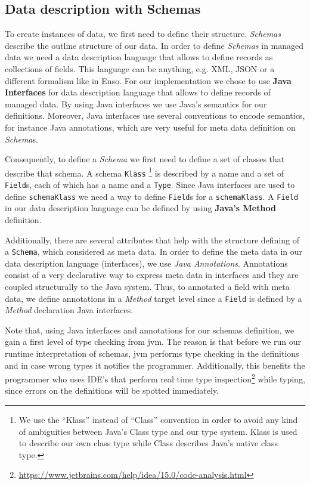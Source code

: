 \subsection{Data description with Schemas}\label{Schema Definition}
To create instances of data, we first need to define their structure.
\textit{Schemas} describe the outline structure of our data.
In order to define \textit{Schemas} in managed data we need a data description language that allows to define records as collections of fields. 
This language can be anything, e.g. XML, JSON or a different formalism like in Enso.
For our implementation we chose to use \textbf{Java Interfaces} for data description language that allows to define records of managed data.
By using Java interfaces we use Java's semantics for our definitions.
Moreover, Java interfaces use several conventions to encode semantics, for instance Java annotations, which are very useful for meta data definition on \textit{Schema}s.

Consequently, to define a \textit{Schema} we first need to define a set of classes that describe that schema.
A schema \texttt{Klass} \footnote{
	We use the ``Klass'' instead of ``Class'' convention in order to avoid any kind of ambiguities between Java's Class type and our type system. Klass is used to describe our own class type while Class describes Java's native class type.} 
is described by a name and a set of \texttt{Field}s, each of which has a name and a \texttt{Type}.
Since Java interfaces are used to define \texttt{schemaKlass} we need a way to define \texttt{Field}s for a \texttt{schemaKlass}.
A \texttt{Field} in our data description language can be defined by using \textbf{Java's Method} definition.

Additionally, there are several attributes that help with the structure defining of a \texttt{Schema}, which considered as meta data.
In order to define the meta data in our data description language (interfaces), we use \textit{Java Annotations}.
Annotations consist of a very declarative way to express meta data in interfaces and they are coupled structurally to the Java system.
Thus, to annotated a field with meta data, we define annotations in a \textit{Method} target level since a \texttt{Field} is defined by a \textit{Method} declaration Java interfaces.

Note that, using Java interfaces and annotations for our schemas definition, we gain a first level of type checking from \ac{jvm}. 
The reason is that before we run our runtime interpretation of schemas, \ac{jvm} performs type checking in the definitions and in case wrong types it notifies the programmer.
Additionally, this benefits the programmer who uses IDE's that perform real time type inspection\footnote{\url{https://www.jetbrains.com/help/idea/15.0/code-analysis.html}} while typing, since errors on the definitions will be spotted immediately. 

